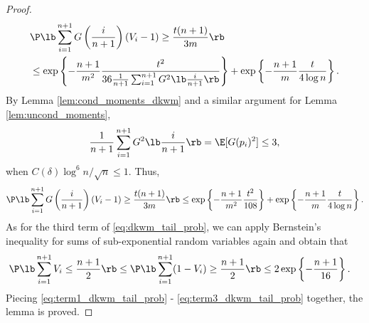 \begin{proof}
  \begin{align*}
    &\P\lb \sum_{i=1}^{n+1}G\left(\frac{i}{n+1}\right)(V_{i} - 1)\ge \frac{t(n+1)}{3m}\rb\\
    & \le \exp \left\{-\frac{n+1}{m^2}\frac{t^2}{36 \frac{1}{n+1}\sum_{i=1}^{n+1}G^2\lb\frac{i}{n+1}\rb}\right\} + \exp\left\{-\frac{n+1}{m}\frac{t}{4\log n}\right\}.
  \end{align*}
  By Lemma \ref{lem:cond_moments_dkwm} and a similar argument for Lemma \ref{lem:uncond_moments},
  \[\frac{1}{n+1}\sum_{i=1}^{n+1}G^2\lb\frac{i}{n+1}\rb = \E[G(p_i)^2] \le 3,\]
  when $C(\delta)\log^6 n / \sqrt{n}\le 1$. Thus,
  \begin{align}
    \label{eq:term2_dkwm_tail_prob}
    \P\lb \sum_{i=1}^{n+1}G\left(\frac{i}{n+1}\right)(V_{i} - 1)\ge \frac{t(n+1)}{3m}\rb \le \exp \left\{-\frac{n+1}{m^2}\frac{t^2}{108}\right\} + \exp\left\{-\frac{n+1}{m}\frac{t}{4\log n}\right\}.
  \end{align}
  As for the third term of \eqref{eq:dkwm_tail_prob}, we can apply Bernstein's inequality for sums of sub-exponential random variables again and obtain that
  \begin{align}
    \label{eq:term3_dkwm_tail_prob}
    &\P\lb \sum_{i=1}^{n+1}V_{i} \le \frac{n+1}{2}\rb \le \P\lb \sum_{i=1}^{n+1}(1 - V_{i})\ge \frac{n+1}{2}\rb\le 2\exp\left\{-\frac{n+1}{16}\right\}.
  \end{align}
  Piecing \eqref{eq:term1_dkwm_tail_prob} - \eqref{eq:term3_dkwm_tail_prob} together, the lemma is proved.
\end{proof}

